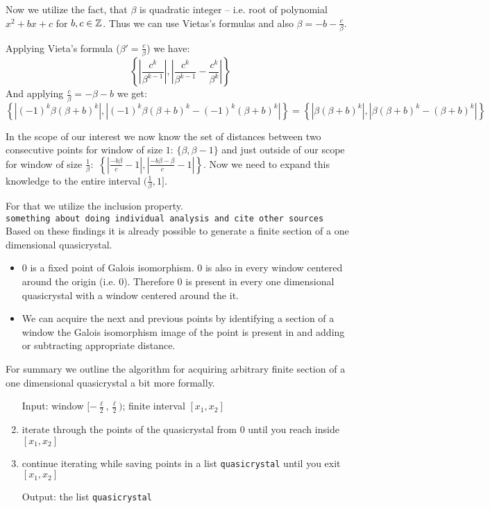 \documentclass[text.tex]{subfiles}
\begin{document}
Now we utilize the fact, that $\beta$ is quadratic integer -- i.e. root of polynomial $x^2+bx+c$ for $b,c\in\mathbb{Z}$. Thus we can use Vietas's formulas and also $\beta = -b-\frac{c}{\beta}$. 

Applying Vieta's formula ($\beta' = \frac{c}{\beta}$) we have:
$$\left\{\left|\frac{c^k}{\beta^{k-1}}\right|, \left|\frac{c^k}{\beta^{k-1}}-\frac{c^k}{\beta^{k}}\right|\right\}$$
And applying $\frac{c}{\beta}=-\beta-b$ we get:
$$\left\{\left|(-1)^k\beta(\beta+b)^k\right|, \left|(-1)^k\beta(\beta+b)^k-(-1)^k(\beta+b)^k\right|\right\} = \left\{\left|\beta(\beta+b)^k\right|, \left|\beta(\beta+b)^k-(\beta+b)^k\right|\right\}$$

In the scope of our interest we now know the set of distances between two consecutive points for window of size $1$: $\{\beta, \beta - 1\}$ and just outside of our scope for window of size $\frac{1}{\beta}$:~$\left\{\left|\frac{-b\beta}{c}-1\right|, \left|\frac{-b\beta-\beta}{c} - 1\right|\right\}$. Now we need to expand this knowledge to the entire interval $(\frac{1}{\beta},1]$. %

For that we utilize the inclusion property. 
\\[2cm]
\texttt{\LARGE something about doing individual analysis and cite other sources}
\\[2cm]

Based on these findings it is already possible to generate a finite section of a one dimensional quasicrystal. 
\begin{itemize}
\item $0$ is a fixed point of Galois isomorphism. $0$ is also in every window centered around the origin (i.e. $0$). Therefore $0$ is present in every one dimensional quasicrystal with a window centered around the it. 
\item We can acquire the next and previous points by identifying a section of a window the Galois isomorphism image of the point is present in and adding or subtracting appropriate distance. 
\end{itemize}

For summary we outline the algorithm for acquiring arbitrary finite section of a one dimensional quasicrystal a bit more formally. 

\begin{enumerate}
\item[Input:] window $[-\frac{\ell}{2},\frac{\ell}{2})$; finite interval $[x_1,x_2]$
\item iterate through the points of the quasicrystal from $0$ until you reach inside $[x_1,x_2]$
\item continue iterating while saving points in a list \texttt{quasicrystal} until you exit $[x_1,x_2]$
\item[Output:] the list \texttt{quasicrystal}
\end{enumerate}
\end{document}
